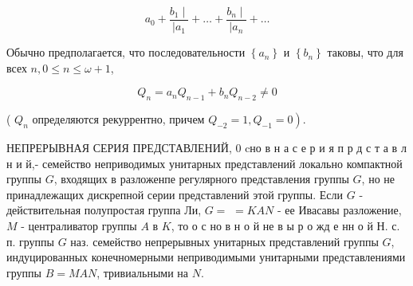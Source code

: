 \documentclass[10pt]{article}
\begin{document}
\[

a_{0}+\frac{b_{1} \mid}{\mid a_{1}}+\ldots+\frac{b_{n} \mid}{\mid a_{n}}+\ldots

\]



Обычно предполагается, что последовательности $\left\{a_{n}\right\}$ и $\left\{b_{n}\right\}$ таковы, что для всех $n, 0 \leqslant n \leqslant \omega+1$,



\[

Q_{n}=a_{n} Q_{n-1}+b_{n} Q_{n-2} \neq 0

\]



( $Q_{n}$ определяются рекуррентно, причем $\left.Q_{-2}=1, Q_{-1}=0\right)$.



НЕПРЕРЫВНАЯ СЕРИЯ ПРЕДСТАВЛЕНИЙ, 0 cно в н а с е р и я п р д с т а в л н и й,- семейство неприводимых унитарных представлений локально компактной группы $G$, входящих в разложенпе регулярного представления группы $G$, но не принадлежащих дискрепной серии представлений этой группы. Если $G$ - действительная полупростая группа Ли, $G=$ $=K A N$ - ее Ивасавы разложение, $M$ - централиватор группы $A$ в $K$, то о с но в н о й не в ы р о жд е нн о й Н. с. п. группы $G$ наз. семейство непрерывных унитарных представлений группы $G$, индуцированных конечномерными неприводимыми унитарными представлениями группы $B=M A N$, тривиальными на $N$.
\end{document}
